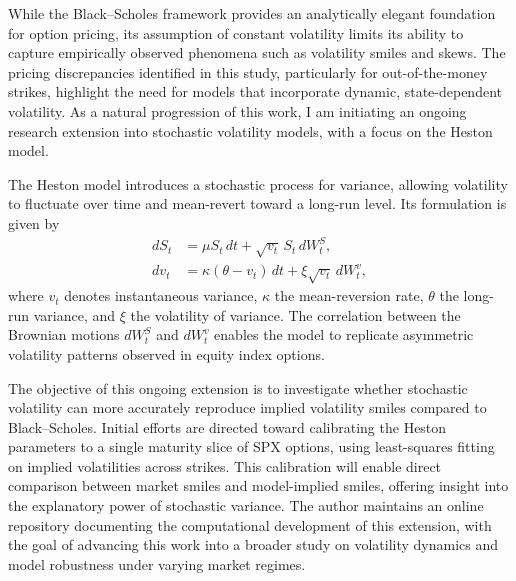 \documentclass[12pt]{article}
\begin{document}
While the Black--Scholes framework provides an analytically elegant foundation for option pricing, its assumption of constant volatility limits its ability to capture empirically observed phenomena such as volatility smiles and skews. The pricing discrepancies identified in this study, particularly for out-of-the-money strikes, highlight the need for models that incorporate dynamic, state-dependent volatility. As a natural progression of this work, I am initiating an ongoing research extension into stochastic volatility models, with a focus on the Heston model.

The Heston model introduces a stochastic process for variance, allowing volatility to fluctuate over time and mean-revert toward a long-run level. Its formulation is given by
\begin{equation}
\begin{aligned}
dS_t &= \mu S_t\,dt + \sqrt{v_t}\, S_t\, dW_t^{S}, \\
dv_t &= \kappa(\theta - v_t)\,dt + \xi \sqrt{v_t}\, dW_t^{v},
\end{aligned}
\end{equation}
where $v_t$ denotes instantaneous variance, $\kappa$ the mean-reversion rate, $\theta$ the long-run variance, and $\xi$ the volatility of variance. The correlation between the Brownian motions $dW_t^{S}$ and $dW_t^{v}$ enables the model to replicate asymmetric volatility patterns observed in equity index options.

The objective of this ongoing extension is to investigate whether stochastic volatility can more accurately reproduce implied volatility smiles compared to Black--Scholes. Initial efforts are directed toward calibrating the Heston parameters to a single maturity slice of SPX options, using least-squares fitting on implied volatilities across strikes. This calibration will enable direct comparison between market smiles and model-implied smiles, offering insight into the explanatory power of stochastic variance. The author maintains an online repository documenting the computational development of this extension, with the goal of advancing this work into a broader study on volatility dynamics and model robustness under varying market regimes.
\end{document}
